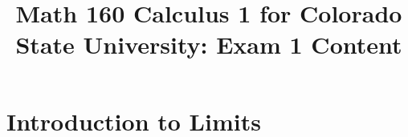 \documentclass[10pt,handout,twocolumn,twoside,wordchoicegiven]{xourse}
\title{Math 160 Calculus 1 for Colorado State University: Exam 1 Content}
\begin{document}
\maketitle

\setcounter{tocdepth}{2}





\part{Introduction to Limits}
\end{document}
